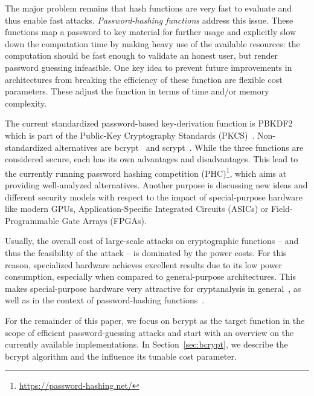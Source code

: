 The major problem remains that hash functions are very fast to evaluate and thus
enable fast attacks. \emph{Password-hashing functions} address this issue. These
functions map a password to key material for further usage and explicitly slow
down the computation time by making heavy use of the available resources: the
computation should be fast enough to validate an honest user, but render
password guessing infeasible. One key idea to prevent future improvements in
architectures from breaking the efficiency of these function are flexible cost
parameters. These adjust the function in terms of time and/or memory complexity.

The current standardized password-based key-derivation function is PBKDF2 which
is part of the Public-Key Cryptography Standards (PKCS)~\cite{RFC2898}.
Non-standardized alternatives are bcrypt~\cite{BCRYPT_paper} and
scrypt~\cite{percival-09-scrypt}.
While the three functions are considered secure, each has its own advantages
and disadvantages. This lead to the currently running password hashing
competition (PHC)\footnote{\cf \url{https://password-hashing.net/}}, which aims
at providing well-analyzed alternatives. Another purpose is discussing new ideas
and different security models with respect to the impact of special-purpose
hardware like modern GPUs, Application-Specific Integrated Circuits
(ASICs) or Field-Programmable Gate Arrays (\mbox{FPGAs}).

Usually, the overall cost of large-scale attacks on cryptographic functions --
and thus the feasibility of the attack -- is dominated by the power costs. For
this reason, specialized hardware achieves excellent results due to its low
power consumption, especially when compared to general-purpose architectures.
This makes special-purpose hardware very attractive for cryptanalysis in
general~\cite{CryptanalysisCOPA, EnhancingCOPA, RealWorldA51, FPGAFactoring},
as well as in the context of password-hashing functions~\cite{PBKDEvalutation}.

For the remainder of this paper, we focus on bcrypt as the target function in
the scope of efficient password-guessing attacks and start with an overview on
the currently available implementations. In Section~\ref{sec:bcrypt}, we describe the bcrypt
algorithm and the influence its tunable cost parameter.

